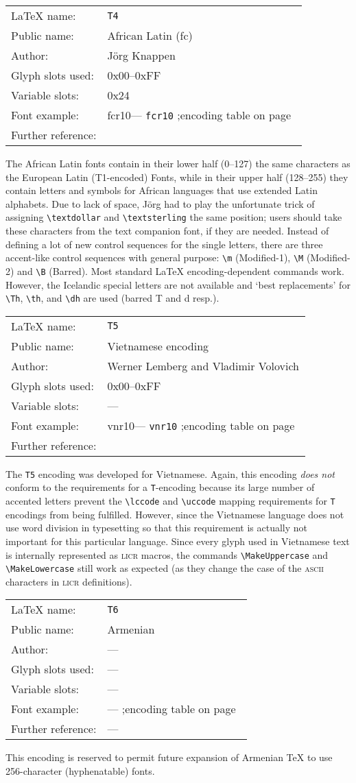 \documentclass{ltxguide}[1994/11/20]
\makeatletter
\providecommand{\Enc}[1]{\texttt{#1}}
\newenvironment{encodinginfo}[7]%
  {\noindent
   \begin{tabularx}{\linewidth}{@{}l>{\raggedright\let\\\tabularnewline}X}%
     \LaTeX{} name:          & \texttt{#1}\\%
     Public name:          & #2\\%
     Author:                   & #3\\%
     Glyph slots used: & #4\\%
     Variable slots:     & #5\\%
     Font example:     & \def\@tempa{#6}\ifx\@tempa\@empty---%
                            \else\texttt{#6}\referenceftable{#6}\fi\\%
     Further reference:                & #7%
   \end{tabularx}%
   \par\nobreak
   \vspace*{3pt}%
   \quote
  }%
  {\endquote
   \vspace{6pt}}
\def\referenceftable#1{
  \@ifundefined{r@fonttable:#1}%
  \relax
  {;\space encoding table on page~\pageref{fonttable:#1}}%
}
\makeatother
\begin{document}
\begin{encodinginfo}{T4}
        {African Latin (fc)}              %
        {J\"org Knappen}              %
        {0x00--0xFF}              %
        {0x24}         %
        {fcr10}              %
        {\cite{tub:JKn93}}

The African Latin fonts contain in their lower half (0--127) the same
characters as the European Latin (T1-encoded) Fonts, while in their
upper half (128--255) they
contain letters and symbols for African languages that use extended
Latin alphabets.
Due to lack of space, J\"org had to play the unfortunate trick of
assigning \verb=\textdollar= and \verb=\textsterling=
the same position; users should take these characters
from the text companion font, if they are needed.  Instead of defining
a lot of new control sequences for the single letters, there are three
accent-like control sequences with general purpose:
\verb=\m= (Modified-1),
\verb=\M= (Modified-2) and
\verb=\B= (Barred).
Most standard \LaTeX{} encoding-dependent commands
work.  However, the Icelandic special letters are not available and `best
replacements' for \verb=\Th=, \verb=\th=, and \verb=\dh=
are used (barred T and d resp.).
\end{encodinginfo}


\begin{encodinginfo}{T5}
        {Vietnamese encoding}
        {Werner Lemberg and
         Vladimir Volovich}
        {0x00--0xFF}
        {---}
        {vnr10}
        {\cite{vnr}}

  The \Enc{T5} encoding was developed for Vietnamese. Again, this encoding
  \emph{does not} conform to the requirements for a \Enc{T}-encoding
  because its large number of accented letters prevent the \verb=\lccode= and
  \verb=\uccode= mapping requirements for \Enc{T} encodings from being
  fulfilled.  However, since the Vietnamese language does not
  use word division in typesetting so that this requirement is
  actually not important for this particular language.
  Since every glyph used in Vietnamese text is internally
  represented as \textsc{licr} macros, the commands  \verb=\MakeUppercase= and
  \verb=\MakeLowercase= still work as expected (as they change the case of the
  \textsc{ascii} characters in \textsc{licr} definitions).

\end{encodinginfo}

\begin{encodinginfo}
  {T6}
  {Armenian}
  {---}
  {---}
  {---}
  {}
  {---}

    This encoding is reserved to permit future expansion of Armenian
  \TeX{} to use 256-character (hyphenatable) fonts.
\end{encodinginfo}
\end{document}
